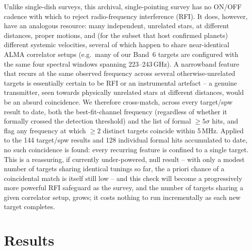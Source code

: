 \documentclass{openjournal}
\begin{document}
Unlike single-dish surveys, this archival, single-pointing survey has no
ON/OFF cadence with which to reject radio-frequency interference (RFI).
It does, however, have an analogous resource: many independent,
unrelated stars, at different distances, proper motions, and (for the
subset that host confirmed planets) different systemic velocities,
several of which happen to share near-identical ALMA correlator setups
(e.g.\ many of our Band~6 targets are configured with the same four
spectral windows spanning 223--243\,GHz). A narrowband feature that
recurs at the same observed frequency across several otherwise-unrelated
targets is essentially certain to be RFI or an instrumental artefact --
a genuine transmitter, seen towards physically unrelated stars at
different distances, would be an absurd coincidence. We therefore
cross-match, across every target/spw result to date, both the
best-fit-channel frequency (regardless of whether it formally crossed
the detection threshold) and the list of formal $\geq5\sigma$ hits, and
flag any frequency at which $\geq2$ distinct targets coincide within
5\,MHz. Applied to the 144 target/spw results and 128 individual formal
hits accumulated to date, no such coincidence is found: every recurring
feature is confined to a single target. This is a reassuring, if
currently under-powered, null result -- with only a modest number of
targets sharing identical tunings so far, the a priori chance of a
coincidental match is itself still low -- and this check will become a
progressively more powerful RFI safeguard as the survey, and the number
of targets sharing a given correlator setup, grows; it costs nothing to
run incrementally as each new target completes.

\section{Results}
\label{sec:results}
\end{document}

